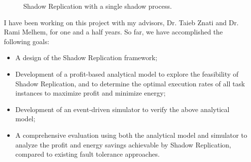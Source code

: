 \begin{figure}[!t]
	\begin{center}
	\end{center}
	\caption{Shadow Replication with a single shadow process.}
	\label{fig:sc_overview}
\end{figure}

I have been working on this project with my advisors, Dr. Taieb Znati and Dr. Rami Melhem, for one and a half years.
So far, we have accomplished the following goals:
\begin{itemize}
	\item A design of the Shadow Replication framework;

	\item Development of a profit-based analytical model to explore the feasibility of
	  Shadow Replication, and to determine the optimal
	  execution rates of all task instances to maximize profit and minimize energy;

	\item Development of an event-driven simulator to verify the above analytical model;

	\item A comprehensive evaluation using both the analytical model and simulator to analyze the profit and 
	energy savings achievable by Shadow Replication, compared to existing fault tolerance approaches.
\end{itemize}

